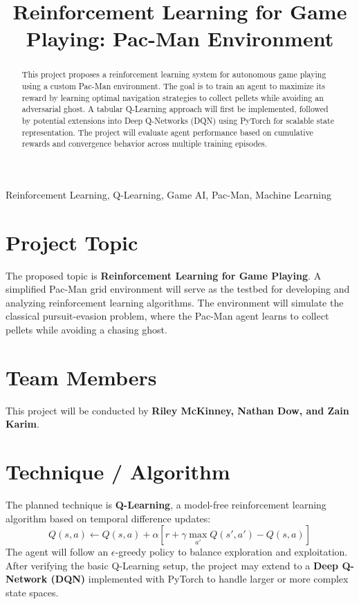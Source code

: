 \documentclass[conference]{IEEEtran}
\begin{document}
\title{Reinforcement Learning for Game Playing: Pac-Man Environment}

\author{
}

\maketitle

\begin{abstract}
This project proposes a reinforcement learning system for autonomous game playing using a custom Pac-Man environment. The goal is to train an agent to maximize its reward by learning optimal navigation strategies to collect pellets while avoiding an adversarial ghost. A tabular Q-Learning approach will first be implemented, followed by potential extensions into Deep Q-Networks (DQN) using PyTorch for scalable state representation. The project will evaluate agent performance based on cumulative rewards and convergence behavior across multiple training episodes.
\end{abstract}

\begin{IEEEkeywords}
Reinforcement Learning, Q-Learning, Game AI, Pac-Man, Machine Learning
\end{IEEEkeywords}

\section{Project Topic}
The proposed topic is \textbf{Reinforcement Learning for Game Playing}.  
A simplified Pac-Man grid environment will serve as the testbed for developing and analyzing reinforcement learning algorithms. The environment will simulate the classical pursuit-evasion problem, where the Pac-Man agent learns to collect pellets while avoiding a chasing ghost.

\section{Team Members}
This project will be conducted by \textbf{Riley McKinney, Nathan Dow, and Zain Karim}.

\section{Technique / Algorithm}
The planned technique is \textbf{Q-Learning}, a model-free reinforcement learning algorithm based on temporal difference updates:
\begin{equation}
Q(s,a) \leftarrow Q(s,a) + \alpha [r + \gamma \max_{a'} Q(s',a') - Q(s,a)]
\end{equation}
The agent will follow an $\epsilon$-greedy policy to balance exploration and exploitation.  
After verifying the basic Q-Learning setup, the project may extend to a \textbf{Deep Q-Network (DQN)} implemented with PyTorch to handle larger or more complex state spaces.
\end{document}

